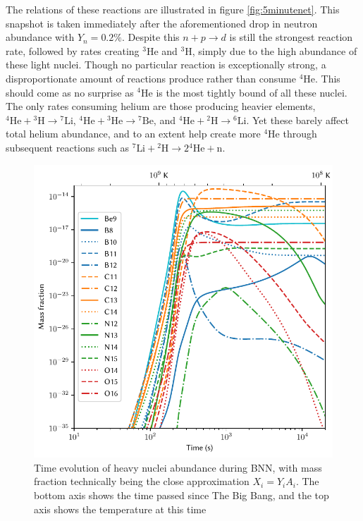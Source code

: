 The relations of these reactions are illustrated in figure \ref{fig:5minutenet}. This snapshot is taken immediately after the aforementioned drop in neutron abundance with $Y_n=0.2\%$. Despite this $n+p\rightarrow d$ is still the strongest reaction rate, followed by rates creating ${}^3$He and ${}^3$H, simply due to the high abundance of these light nuclei. Though no particular reaction is exceptionally strong, a disproportionate amount of reactions produce rather than consume ${}^4$He. This should come as no surprise as ${}^4$He is the most tightly bound of all these nuclei. The only rates consuming helium are those producing heavier elements, ${}^4\text{He}+{}^3\text{H}\rightarrow {}^7\text{Li}$, ${}^4\text{He}+{}^3\text{He}\rightarrow {}^7\text{Be}$, and ${}^4\text{He}+{}^2\text{H}\rightarrow {}^6\text{Li}$. Yet these barely affect total helium abundance, and to an extent help create more ${}^4$He through subsequent reactions such as ${}^7\text{Li}+{}^2\text{H}\rightarrow 2 {}^4\text{He}+\text{n}$. 


\begin{figure}[ht]
    \includegraphics[width=5.1in]{figures/abundanceheavy.pdf}
    \caption{Time evolution of heavy nuclei abundance during BNN, with mass fraction technically being the close approximation $X_i=Y_i A_i$. The bottom axis shows the time passed since The Big Bang, and the top axis shows the temperature at this time}
    \label{fig:heavyXevo}
\end{figure}

